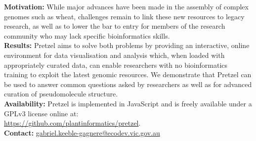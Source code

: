 \textbf{Motivation:}
While major advances have been made in the assembly of complex genomes such as wheat, challenges
remain to link these new resources to legacy research, as well as to lower the bar to entry for
members of the research community who may lack specific bioinformatics skills. 
\\
\textbf{Results:} 
Pretzel aims to solve both problems by providing an interactive, online environment for data visualisation and analysis which, when loaded with appropriately curated data, can enable researchers with no bioinformatics training to exploit the latest genomic resources. 
We demonstrate that Pretzel can be used to answer common questions asked by researchers as well as for advanced curation of pseudomolecule structure.
\\
\textbf{Availability:} 
Pretzel is implemented in JavaScript and is freely available under a GPLv3 license online at: 
\\
\href{https://github.com/plantinformatics/pretzel}{https://github.com/plantinformatics/pretzel}.
\\
\textbf{Contact:}
\href{gabriel.keeble-gagnere@ecodev.vic.gov.au}{gabriel.keeble-gagnere@ecodev.vic.gov.au}\\
